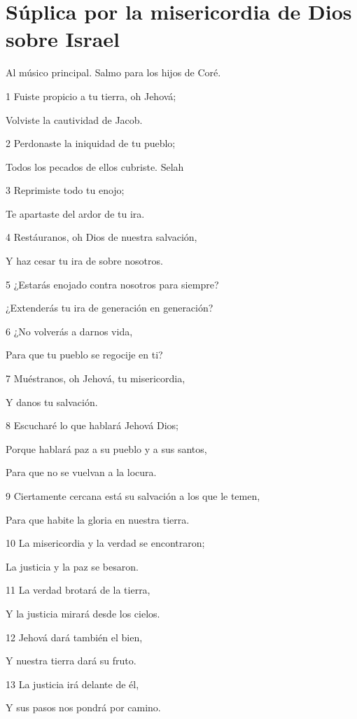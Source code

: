 \section*{Súplica por la misericordia de Dios sobre Israel}

\par Al músico principal. Salmo para los hijos de Coré.

\par 1 Fuiste propicio a tu tierra, oh Jehová;
\par Volviste la cautividad de Jacob.
\par 2 Perdonaste la iniquidad de tu pueblo;
\par Todos los pecados de ellos cubriste. Selah
\par 3 Reprimiste todo tu enojo;
\par Te apartaste del ardor de tu ira.
\par 4 Restáuranos, oh Dios de nuestra salvación,
\par Y haz cesar tu ira de sobre nosotros.
\par 5 ¿Estarás enojado contra nosotros para siempre?
\par ¿Extenderás tu ira de generación en generación?
\par 6 ¿No volverás a darnos vida,
\par Para que tu pueblo se regocije en ti?
\par 7 Muéstranos, oh Jehová, tu misericordia,
\par Y danos tu salvación.
\par 8 Escucharé lo que hablará Jehová Dios;
\par Porque hablará paz a su pueblo y a sus santos,
\par Para que no se vuelvan a la locura.
\par 9 Ciertamente cercana está su salvación a los que le temen,
\par Para que habite la gloria en nuestra tierra.
\par 10 La misericordia y la verdad se encontraron;
\par La justicia y la paz se besaron.
\par 11 La verdad brotará de la tierra,
\par Y la justicia mirará desde los cielos.
\par 12 Jehová dará también el bien,
\par Y nuestra tierra dará su fruto.
\par 13 La justicia irá delante de él,
\par Y sus pasos nos pondrá por camino.

